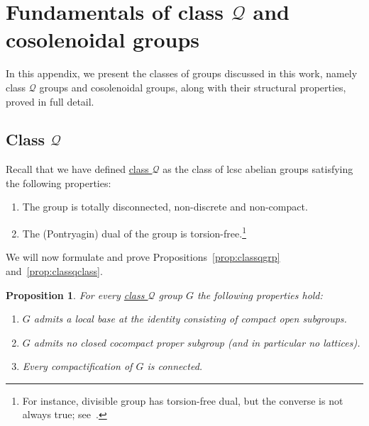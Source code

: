 \documentclass{amsart}
\numberwithin{equation}{subsection}
\newtheorem{prop}[thm]{Proposition}
\theoremstyle{remark}
\begin{document}
\appendix

\section{Fundamentals of class \(\mathcal{Q}\) and cosolenoidal groups}\label{app:classcoss}

In this appendix, we present the classes of groups discussed in this work, namely class \(\mathcal{Q}\) groups and cosolenoidal groups, along with their structural properties, proved in full detail.

\subsection{Class \(\mathcal{Q}\)}

Recall that we have defined \hyperlink{classQ}{class \(\mathcal{Q}\)} as the class of lcsc abelian groups satisfying the following properties:
\begin{enumerate}
    \item The group is totally disconnected, non-discrete and non-compact.
    \item The (Pontryagin) dual of the group is torsion-free.\footnote{For instance, divisible group has torsion-free dual, but the converse is not always true; see~\cite[Theorem (24.23)]{HewittRoss}.}
\end{enumerate}

We will now formulate and prove Propositions~\ref{prop:classqgrp} and~\ref{prop:classqclass}.

\begin{prop}\label{prop:classqgrp-App}
For every \hyperlink{classQ}{class \(\mathcal{Q}\)} group \(G\) the following properties hold:
\begin{enumerate}
    \item \(G\) admits a local base at the identity consisting of compact open subgroups.
    \item \(G\) admits no closed cocompact proper subgroup (and in particular no lattices).
    \item Every compactification of \(G\) is connected.
\end{enumerate}
\end{prop}
\end{document}
